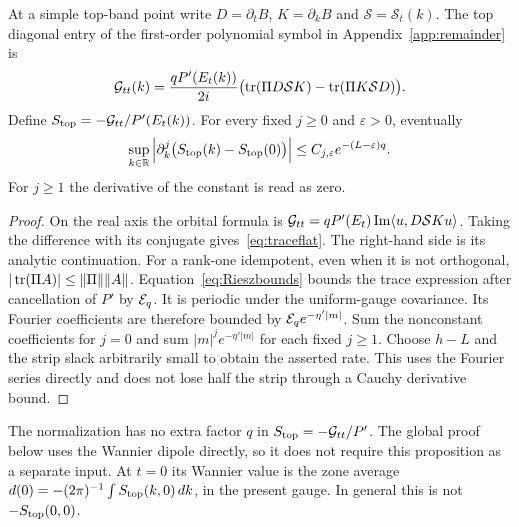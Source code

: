 \begin{proposition}\label{prop:flatness}
At a simple top-band point write $D=\partial_tB$, $K=\partial_kB$ and $\mathcal S=\mathcal S_t(k)$. The top diagonal entry of the first-order polynomial symbol in Appendix~\ref{app:remainder} is
\begin{equation}\label{eq:traceflat}
 \mathcal G_{tt}(k)=\frac{qP'(E_t(k))}{2i}
 \bigl(\operatorname{tr}(\Pi D\mathcal SK)-\operatorname{tr}(\Pi K\mathcal SD)\bigr).
\end{equation}
Define $S_{\rm top}=-\mathcal G_{tt}/P'(E_t(k))$. For every fixed $j\ge0$ and $\varepsilon>0$, eventually
\[
 \sup_{k\in\mathbb R}\left|
 \partial_k^j\bigl(S_{\rm top}(k)-S_{\rm top}(0)\bigr)\right|
 \le C_{j,\varepsilon}e^{-(L-\varepsilon)q}.
\]
For $j\ge1$ the derivative of the constant is read as zero.
\end{proposition}
\begin{proof}
On the real axis the orbital formula is
$\mathcal G_{tt}=qP'(E_t)\operatorname{Im}\langle u,D\mathcal SKu\rangle$. Taking the difference with its conjugate gives~\eqref{eq:traceflat}. The right-hand side is its analytic continuation. For a rank-one idempotent, even when it is not orthogonal, $|\operatorname{tr}(\Pi A)|\le\lVert \Pi\rVert\lVert A\rVert$. Equation~\eqref{eq:Rieszbounds} bounds the trace expression after cancellation of $P'$ by $\mathcal E_q$. It is periodic under the uniform-gauge covariance. Its Fourier coefficients are therefore bounded by $\mathcal E_q e^{-\eta'|m|}$. Sum the nonconstant coefficients for $j=0$ and sum $|m|^je^{-\eta'|m|}$ for each fixed $j\ge1$. Choose $h-L$ and the strip slack arbitrarily small to obtain the asserted rate. This uses the Fourier series directly and does not lose half the strip through a Cauchy derivative bound.
\end{proof}

The normalization has no extra factor $q$ in $S_{\rm top}=-\mathcal G_{tt}/P'$. The global proof below uses the Wannier dipole directly, so it does not require this proposition as a separate input. At $t=0$ its Wannier value is the zone average $d(0)=-(2\pi)^{-1}\int S_{\rm top}(k,0)\,dk$, in the present gauge. In general this is not $-S_{\rm top}(0,0)$.

\label{end:top}
